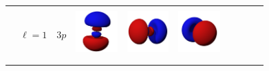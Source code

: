 \begin{landscape}
\begin{xltabular}{\linewidth}{C C C c c c c c c c}
& & &  & & & & & &  \\ %

\addlinespace

&  &  & 
\includegraphics[width=1.6cm]{tableau_geometrie_orbitale_modelisation/P3z.png} 
&
\includegraphics[width=1.6cm]{tableau_geometrie_orbitale_modelisation/P3x.png}  
&
\includegraphics[width=1.6cm]{tableau_geometrie_orbitale_modelisation/P3y.png} 
& & & & \\

& & &  &  &  & & & &  \\ %

\addlinespace


\end{xltabular}
\end{landscape}
